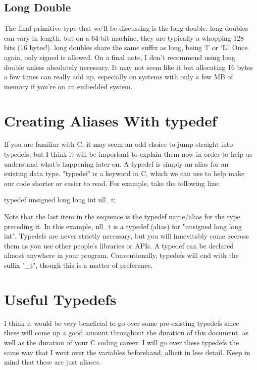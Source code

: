 \documentclass{article}
\begin{document}
\subsection{Long Double}

The final primitive type that we’ll be discussing is the long double. long doubles can vary in length, but on
a 64-bit machine, they are typically a whopping 128 bits (16 bytes!). long doubles share the same suffix as
long, being ‘l’ or ‘L’. Once again, only signed is allowed. On a final note, I don’t recommend using long
double unless absolutely necessary. It may not seem like it but allocating 16 bytes a few times can really add
up, especially on systems with only a few MB of memory if you’re on an embedded system.

\section{Creating Aliases With typedef}

If you are familiar with C, it may seem an odd choice to jump straight into typedefs, but I think it will be
important to explain them now in order to help us understand what’s happening later on. A typedef is simply an
alias for an existing data type. "typedef" is a keyword in C, which we can use to help make our code shorter or
easier to read. For example, take the following line:

\begin{clst}
typedef unsigned long long int ull_t;
\end{clst}

Note that the last item in the sequence is the typedef name/alias for the type preceding it. In this example,
ull\_t is a typedef (alias) for "unsigned long long int". Typedefs are never strictly necessary, but you will
innevitably come accross them as you use other people's libraries or APIs. A typedef can be declared almost
anywhere in your program. Conventionally, typedefs will end with the suffix "\_t", though this is a matter of
preference.

\section{Useful Typedefs}

I think it would be very beneficial to go over some pre-existing typedefs since these will come up a good
amount throughout the duration of this document, as well as the duration of your C coding career. I will go
over these typedefs the same way that I went over the variables beforehand, albeit in less detail. Keep in
mind that these are just aliases.
\end{document}

